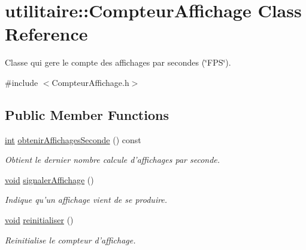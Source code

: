 \hypertarget{classutilitaire_1_1_compteur_affichage}{\section{utilitaire\-:\-:Compteur\-Affichage Class Reference}
\label{classutilitaire_1_1_compteur_affichage}
}


Classe qui gere le compte des affichages par secondes (\char`\"{}\-F\-P\-S\char`\"{}).  




{\ttfamily \#include $<$Compteur\-Affichage.\-h$>$}

\subsection*{Public Member Functions}
\begin{DoxyCompactItemize}
\item 
\hyperlink{wglew_8h_a500a82aecba06f4550f6849b8099ca21}{int} \hyperlink{classutilitaire_1_1_compteur_affichage_a1902a495b4898b3f7ab9056537db00cc}{obtenir\-Affichages\-Seconde} () const 
\begin{DoxyCompactList}\small\item\em Obtient le dernier nombre calcule d'affichages par seconde. \end{DoxyCompactList}\item 
\hyperlink{wglew_8h_aeea6e3dfae3acf232096f57d2d57f084}{void} \hyperlink{classutilitaire_1_1_compteur_affichage_a49f6562d1a37e275ff8c8c0e9be41ab5}{signaler\-Affichage} ()
\begin{DoxyCompactList}\small\item\em Indique qu'un affichage vient de se produire. \end{DoxyCompactList}\item 
\hyperlink{wglew_8h_aeea6e3dfae3acf232096f57d2d57f084}{void} \hyperlink{classutilitaire_1_1_compteur_affichage_a69b89a3d76cde700f1c08580bab010ca}{reinitialiser} ()
\begin{DoxyCompactList}\small\item\em Reinitialise le compteur d'affichage. \end{DoxyCompactList}\end{DoxyCompactItemize}
